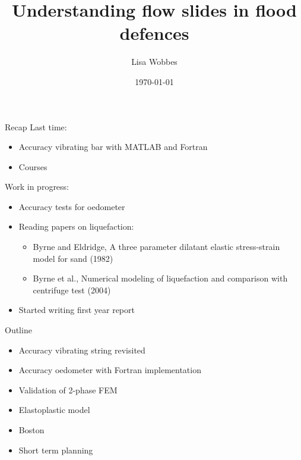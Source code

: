 \documentclass[mathserif,professionalfont,hyperref={pdfpagelabels=false}]{beamer}
\title[]{\normalsize{Understanding flow slides in flood defences}}
\institute[]{}
\author[]{Lisa Wobbes}
\date[\today]{\today}
\begin{document}
{
\frame{\titlepage}
}

\begin{frame}{Recap}
Last time:
\begin{itemize}
\item Accuracy vibrating bar with MATLAB and Fortran
\item Courses 
\end{itemize}
\pause
 Work in progress:
\begin{itemize}
\item Accuracy tests for oedometer
\item Reading papers on liquefaction:
\begin{itemize}
\item Byrne and Eldridge, A three parameter dilatant elastic stress-strain model for sand (1982)
\item Byrne et al., Numerical modeling of liquefaction and comparison with centrifuge test (2004)
\end{itemize}
\item Started writing first year report 
\end{itemize}
\end{frame}
\begin{frame}{Outline}
\begin{itemize}
\item Accuracy vibrating string revisited
\item Accuracy oedometer with Fortran implementation
\item Validation of 2-phase FEM
\item Elastoplastic model
\item Boston
\item Short term planning
\end{itemize}
\end{frame}

\end{document}

